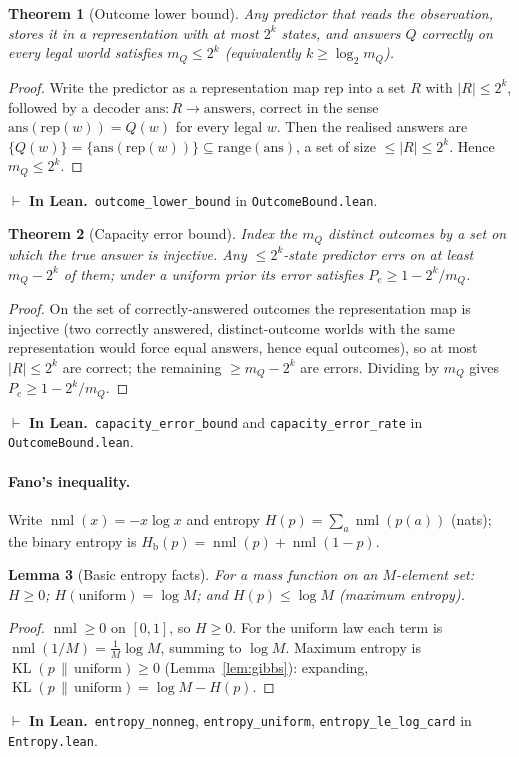 \documentclass[11pt]{article}
\newcommand{\KL}{\operatorname{KL}}
\newcommand{\binent}{H_{\mathrm b}}          %
\newcommand{\nml}{\operatorname{nml}}        %
\newcommand{\lean}[1]{\texttt{#1}}           %
\theoremstyle{plain}
\newtheorem{theorem}{Theorem}
\newtheorem{lemma}[theorem]{Lemma}
\theoremstyle{definition}
\newcommand{\inlean}[1]{\par\smallskip\noindent%
  {\small\textcolor{blue!50!black}{$\vdash$ \textbf{In Lean.}}~#1}\par\smallskip}
\begin{document}
\begin{theorem}[Outcome lower bound]\label{thm:outcome}
Any predictor that reads the observation, stores it in a representation with at most $2^k$
states, and answers $Q$ correctly on every legal world satisfies $m_Q\le 2^k$ (equivalently
$k\ge\log_2 m_Q$).
\end{theorem}
\begin{proof}
Write the predictor as a representation map $\mathrm{rep}$ into a set $R$ with $|R|\le 2^k$,
followed by a decoder $\mathrm{ans}:R\to\text{answers}$, correct in the sense
$\mathrm{ans}(\mathrm{rep}(w))=Q(w)$ for every legal $w$. Then the realised answers are
$\{Q(w)\}=\{\mathrm{ans}(\mathrm{rep}(w))\}\subseteq\mathrm{range}(\mathrm{ans})$, a set of size
$\le|R|\le 2^k$. Hence $m_Q\le 2^k$.
\end{proof}
\inlean{\lean{outcome\_lower\_bound} in \lean{OutcomeBound.lean}.}

\begin{theorem}[Capacity error bound]\label{thm:capacity}
Index the $m_Q$ distinct outcomes by a set on which the true answer is injective. Any
$\le 2^k$-state predictor errs on at least $m_Q-2^k$ of them; under a uniform prior its error
satisfies $P_e\ge 1-2^k/m_Q$.
\end{theorem}
\begin{proof}
On the set of correctly-answered outcomes the representation map is injective (two correctly
answered, distinct-outcome worlds with the same representation would force equal answers, hence
equal outcomes), so at most $|R|\le 2^k$ are correct; the remaining $\ge m_Q-2^k$ are errors.
Dividing by $m_Q$ gives $P_e\ge 1-2^k/m_Q$.
\end{proof}
\inlean{\lean{capacity\_error\_bound} and \lean{capacity\_error\_rate} in \lean{OutcomeBound.lean}.}

\paragraph{Fano's inequality.}
Write $\nml(x)=-x\log x$ and entropy $H(p)=\sum_a\nml(p(a))$ (nats); the binary entropy is
$\binent(p)=\nml(p)+\nml(1-p)$.

\begin{lemma}[Basic entropy facts]\label{lem:entropy-basic}
For a mass function on an $M$-element set: $H\ge 0$; $H(\text{uniform})=\log M$; and
$H(p)\le\log M$ (maximum entropy).
\end{lemma}
\begin{proof}
$\nml\ge0$ on $[0,1]$, so $H\ge0$. For the uniform law each term is $\nml(1/M)=\frac1M\log M$,
summing to $\log M$. Maximum entropy is $\KL(p\,\|\,\text{uniform})\ge0$
(Lemma~\ref{lem:gibbs}): expanding, $\KL(p\,\|\,\text{uniform})=\log M-H(p)$.
\end{proof}
\inlean{\lean{entropy\_nonneg}, \lean{entropy\_uniform}, \lean{entropy\_le\_log\_card} in
\lean{Entropy.lean}.}
\end{document}
